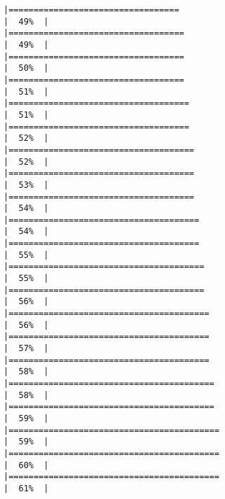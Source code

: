 \documentclass[10pt,letterpaper]{article}
\begin{document}
\begin{verbatim}
|==================================                                    |  49%  |                                                                              |===================================                                   |  49%  |                                                                              |===================================                                   |  50%  |                                                                              |===================================                                   |  51%  |                                                                              |====================================                                  |  51%  |                                                                              |====================================                                  |  52%  |                                                                              |=====================================                                 |  52%  |                                                                              |=====================================                                 |  53%  |                                                                              |=====================================                                 |  54%  |                                                                              |======================================                                |  54%  |                                                                              |======================================                                |  55%  |                                                                              |=======================================                               |  55%  |                                                                              |=======================================                               |  56%  |                                                                              |========================================                              |  56%  |                                                                              |========================================                              |  57%  |                                                                              |========================================                              |  58%  |                                                                              |=========================================                             |  58%  |                                                                              |=========================================                             |  59%  |                                                                              |==========================================                            |  59%  |                                                                              |==========================================                            |  60%  |                                                                              |==========================================                            |  61%  |                                                                              
\end{verbatim}
\end{document}
